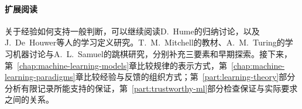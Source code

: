 \paragraph{扩展阅读}

关于经验如何支持一般判断，可以继续阅读D.~Hume的归纳讨论，以及J.~De~Houwer等人的学习定义研究。T.~M.~Mitchell的教材、A.~M.~Turing的学习机器讨论与A.~L.~Samuel的跳棋研究，分别补充三要素和早期探索。接下来，第~\ref{chap:machine-learning-models}章比较规律的表示方式，第~\ref{chap:machine-learning-paradigms}章比较经验与反馈的组织方式；第~\ref{part:learning-theory}部分分析有限记录所能支持的保证，第~\ref{part:trustworthy-ml}部分检查保证与实际要求之间的关系。
